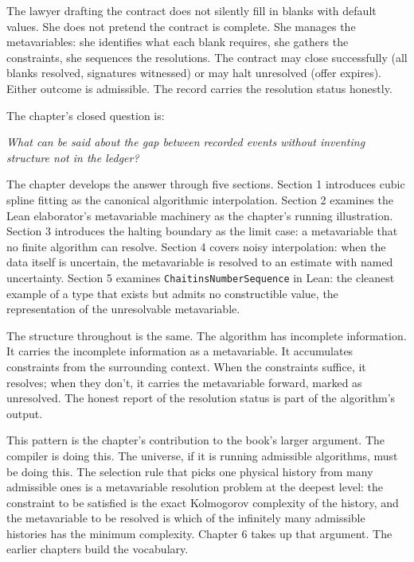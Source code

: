 \begin{chapteressay}
The lawyer drafting the contract does not silently fill in blanks
with default values. She does not pretend the contract is complete.
She manages the metavariables: she identifies what each blank
requires, she gathers the constraints, she sequences the resolutions.
The contract may close successfully (all blanks resolved, signatures
witnessed) or may halt unresolved (offer expires). Either outcome is
admissible. The record carries the resolution status honestly.

The chapter's closed question is:

\begin{center}
\emph{What can be said about the gap between recorded events without
inventing structure not in the ledger?}
\end{center}

The chapter develops the answer through five sections. Section 1
introduces cubic spline fitting as the canonical algorithmic
interpolation. Section 2 examines the Lean elaborator's metavariable
machinery as the chapter's running illustration. Section 3 introduces
the halting boundary as the limit case: a metavariable that no finite
algorithm can resolve. Section 4 covers noisy interpolation: when the
data itself is uncertain, the metavariable is resolved to an
estimate with named uncertainty. Section 5 examines
\texttt{ChaitinsNumberSequence} in Lean: the cleanest example of a
type that exists but admits no constructible value, the
representation of the unresolvable metavariable.

The structure throughout is the same. The algorithm has incomplete
information. It carries the incomplete information as a metavariable.
It accumulates constraints from the surrounding context. When the
constraints suffice, it resolves; when they don't, it carries the
metavariable forward, marked as unresolved. The honest report of the
resolution status is part of the algorithm's output.

This pattern is the chapter's contribution to the book's larger
argument. The compiler is doing this. The universe, if it is running
admissible algorithms, must be doing this. The selection rule that
picks one physical history from many admissible ones is a
metavariable resolution problem at the deepest level: the
constraint to be satisfied is the exact Kolmogorov complexity of the
history, and the metavariable to be resolved is which of the
infinitely many admissible histories has the minimum complexity.
Chapter 6 takes up that argument. The earlier chapters build the
vocabulary.

\end{chapteressay}

